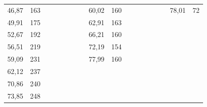 \begin{enumerate}
\begin{table}[h!]
{\begin{tabular}{|cc|cccccccccccccccc}
					\multicolumn{1}{|c|}{46,87}    & 163               &  &  &  &  &  & \multicolumn{1}{c|}{} & \multicolumn{1}{c|}{60,02}    & \multicolumn{1}{c|}{160}               &  &  &  &  &  & \multicolumn{1}{c|}{} & \multicolumn{1}{c|}{78,01}    & \multicolumn{1}{c|}{72}                \\ \cline{1-2} \cline{9-10} \cline{17-18} 
					\multicolumn{1}{|c|}{49,91}    & 175               &  &  &  &  &  & \multicolumn{1}{c|}{} & \multicolumn{1}{c|}{62,91}    & \multicolumn{1}{c|}{163}               &  &  &  &  &  &                       &                               &                                        \\ \cline{1-2} \cline{9-10}
					\multicolumn{1}{|c|}{52,67}    & 192               &  &  &  &  &  & \multicolumn{1}{c|}{} & \multicolumn{1}{c|}{66,21}    & \multicolumn{1}{c|}{160}               &  &  &  &  &  &                       &                               &                                        \\ \cline{1-2} \cline{9-10}
					\multicolumn{1}{|c|}{56,51}    & 219               &  &  &  &  &  & \multicolumn{1}{c|}{} & \multicolumn{1}{c|}{72,19}    & \multicolumn{1}{c|}{154}               &  &  &  &  &  &                       &                               &                                        \\ \cline{1-2} \cline{9-10}
					\multicolumn{1}{|c|}{59,09}    & 231               &  &  &  &  &  & \multicolumn{1}{c|}{} & \multicolumn{1}{c|}{77,99}    & \multicolumn{1}{c|}{160}               &  &  &  &  &  &                       &                               &                                        \\ \cline{1-2} \cline{9-10}
					\multicolumn{1}{|c|}{62,12}    & 237               &  &  &  &  &  &                       &                               &                                        &  &  &  &  &  &                       &                               &                                        \\ \cline{1-2}
					\multicolumn{1}{|c|}{70,86}    & 240               &  &  &  &  &  &                       &                               &                                        &  &  &  &  &  &                       &                               &                                        \\ \cline{1-2}
					\multicolumn{1}{|c|}{73,85}    & 248               &  &  &  &  &  &                       &                               &                                        &  &  &  &  &  &                       &                               &                                        \\ \cline{1-2}

\end{tabular}}
\end{table}
\end{enumerate}
